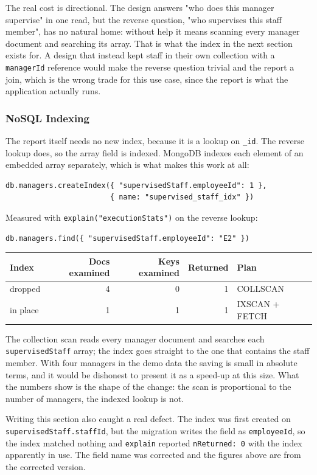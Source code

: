 \documentclass[a4paper, 11pt]{article}          %
\begin{document}
The real cost is directional. The design answers "who does this manager
supervise" in one read, but the reverse question, "who supervises this staff
member", has no natural home: without help it means scanning every manager
document and searching its array. That is what the index in the next section
exists for. A design that instead kept staff in their own collection with a
\texttt{managerId} reference would make the reverse question trivial and the
report a join, which is the wrong trade for this use case, since the report is
what the application actually runs.

\subsubsection{NoSQL Indexing}

The report itself needs no new index, because it is a lookup on \texttt{\_id}.
The reverse lookup does, so the array field is indexed. MongoDB indexes each
element of an embedded array separately, which is what makes this work at all:

\begin{lstlisting}
db.managers.createIndex({ "supervisedStaff.employeeId": 1 },
                        { name: "supervised_staff_idx" })
\end{lstlisting}

Measured with \texttt{explain("executionStats")} on the reverse lookup:

\begin{lstlisting}
db.managers.find({ "supervisedStaff.employeeId": "E2" })
\end{lstlisting}

\begin{center}
\begin{tabular}{lrrrl}
\toprule
Index & Docs examined & Keys examined & Returned & Plan \\
\midrule
dropped  & 4 & 0 & 1 & COLLSCAN \\
in place & 1 & 1 & 1 & IXSCAN + FETCH \\
\bottomrule
\end{tabular}
\end{center}

The collection scan reads every manager document and searches each
\texttt{supervisedStaff} array; the index goes straight to the one that contains
the staff member. With four managers in the demo data the saving is small in
absolute terms, and it would be dishonest to present it as a speed-up at this
size. What the numbers show is the shape of the change: the scan is proportional
to the number of managers, the indexed lookup is not.

Writing this section also caught a real defect. The index was first created on
\texttt{supervisedStaff.staffId}, but the migration writes the field as
\texttt{employeeId}, so the index matched nothing and
\texttt{explain} reported \texttt{nReturned: 0} with the index apparently in
use. The field name was corrected and the figures above are from the corrected
version.
\end{document}
